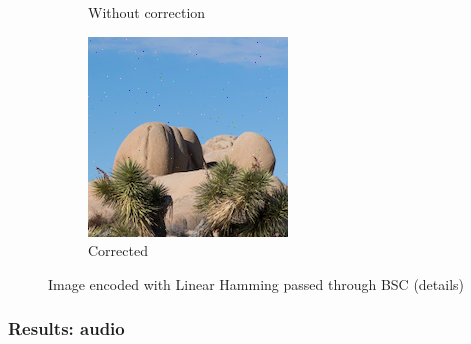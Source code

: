 \documentclass{article}
\begin{document}
\begin{figure}[htb]
\begin{subfigure}[b]{0.32\textwidth}
        \caption{Without correction}
        \label{fig:cropped-image-linear-bsc-no-correction}
    \end{subfigure}
    \hfill
    \begin{subfigure}[b]{0.32\textwidth}
        \centering
        \includegraphics[width=\textwidth]{../Result/cropped-linear-bsc-output-syndrome-corrected.png}
        \caption{Corrected}
        \label{fig:cropped-image-linear-bsc-syndrome-corrected}
    \end{subfigure}
       \caption{Image encoded with Linear Hamming passed through BSC (details)}
       \label{fig:cropped-image-linear-bsc}
\end{figure}


\subsubsection{Results: audio}
\end{document}
